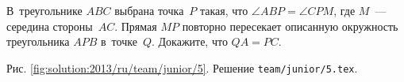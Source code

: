 \problem{}
В~треугольнике $ABC$ выбрана точка~$P$ такая, что $\angle ABP = \angle CPM$,
где $M$~--- середина стороны~$AC$.
Прямая $MP$ повторно пересекает описанную окружность треугольника $APB$
в~точке~$Q$.
Докажите, что $QA = PC$.

%
\label{solution:2013/ru/team/junior/5}
Рис. \ref{fig:solution:2013/ru/team/junior/5}.
Решение \texttt{team/junior/5.tex}.
\endproblem

